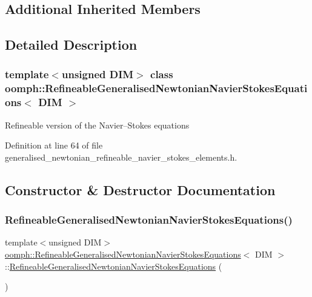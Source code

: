 \subsection*{Additional Inherited Members}


\subsection{Detailed Description}
\subsubsection*{template$<$unsigned D\+IM$>$\newline
class oomph\+::\+Refineable\+Generalised\+Newtonian\+Navier\+Stokes\+Equations$<$ D\+I\+M $>$}

Refineable version of the Navier--Stokes equations 

Definition at line 64 of file generalised\+\_\+newtonian\+\_\+refineable\+\_\+navier\+\_\+stokes\+\_\+elements.\+h.



\subsection{Constructor \& Destructor Documentation}
\mbox{\label{classoomph_1_1RefineableGeneralisedNewtonianNavierStokesEquations_a90b768448667ce9aa7932c76f9d4bc88}} 
\subsubsection{\texorpdfstring{Refineable\+Generalised\+Newtonian\+Navier\+Stokes\+Equations()}{RefineableGeneralisedNewtonianNavierStokesEquations()}}
{\footnotesize\ttfamily template$<$unsigned D\+IM$>$ \\
\hyperlink{classoomph_1_1RefineableGeneralisedNewtonianNavierStokesEquations}{oomph\+::\+Refineable\+Generalised\+Newtonian\+Navier\+Stokes\+Equations}$<$ D\+IM $>$\+::\hyperlink{classoomph_1_1RefineableGeneralisedNewtonianNavierStokesEquations}{Refineable\+Generalised\+Newtonian\+Navier\+Stokes\+Equations} (\begin{DoxyParamCaption}{ }\end{DoxyParamCaption})\hspace{0.3cm}{\ttfamily [inline]}}



